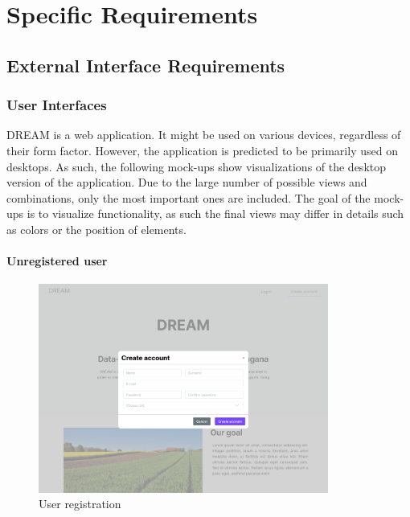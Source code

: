 \chapter{Specific Requirements}

\section{External Interface Requirements}

\subsection{User Interfaces}
DREAM is a web application. It might be used on various devices, regardless of their form factor. 
However, the application is predicted to be primarily used on desktops. As such, the following mock-ups show visualizations of the desktop version of the application. Due to the large number of possible views and combinations, only the most important ones are included. The goal of the mock-ups is to visualize functionality, as such the final views may differ in details such as colors or the position of elements.

\subsubsection{Unregistered user}

\begin{figure}[H]
\centering
\includegraphics[width=0.85\textwidth]{mockups/Unreg. user_Create account.png}
\caption{User registration}
\end{figure}


